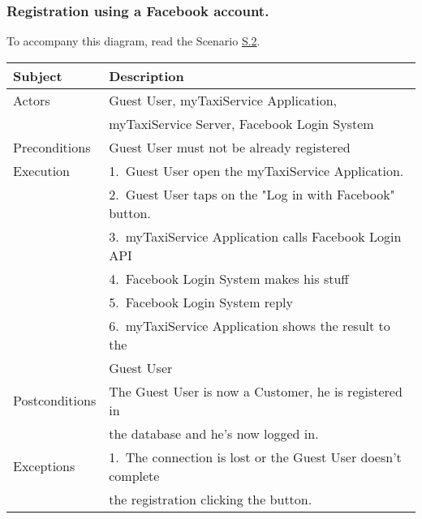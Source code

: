 \subsubsection{Registration using a Facebook account.}

	To accompany this diagram, read the Scenario \hyperref[sec:FacebookCustomerRegistrationScenario]{S.2}.

				\begin{table}[htpb]
					\centering
					\label{tab:FacebookCustomerRegistrationDiagramTable}
					\begin{tabularx}{\textwidth}{ll}
						\hline
						\hline
							\textbf{Subject}
						& 
							\textbf{Description}\\
						\hline
							Actors	       &  Guest User, myTaxiService Application, \\
							               &  myTaxiService Server, Facebook Login System\\
						\hline
							Preconditions  &  Guest User must not be already registered\\
						\hline
							Execution      &  1.~Guest User open the myTaxiService Application.\\
										   &  2.~Guest User taps on the "Log in with Facebook" button.\\
										   &  3.~myTaxiService Application calls Facebook Login API\\
										   &  4.~Facebook Login System makes his stuff\\
										   &  5.~Facebook Login System reply\\
										   &  6.~myTaxiService Application shows the result to the \\
										   &     Guest User\\
						\hline
							Postconditions &  The Guest User is now a Customer, he is registered in \\ 
										   &  the database and he's now logged in.\\
						\hline
							Exceptions     &  1.~The connection is lost or the Guest User doesn't complete\\ 
										   &     the registration clicking the button.\\
									
						\hline
						\hline
					\end{tabularx}
				\end{table}
				\begin{center}
				\end{center}
